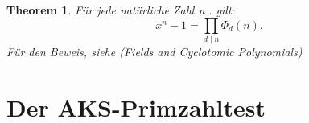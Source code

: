 \documentclass[12pt,oneside]{article}
\newtheorem{theorem}{Theorem}[section]
\theoremstyle{remark}
\theoremstyle{definition}
\begin{document}
\smallskip

\begin{theorem}
Für jede natürliche Zahl n . gilt:\newline
\begin{equation}
    x^n - 1 = \prod_{d \mid n} \Phi_{d}(n).
\end{equation}
Für den Beweis, siehe (Fields and Cyclotomic Polynomials) 
\end{theorem}

\smallskip


\section{Der AKS-Primzahltest}
\end{document}
